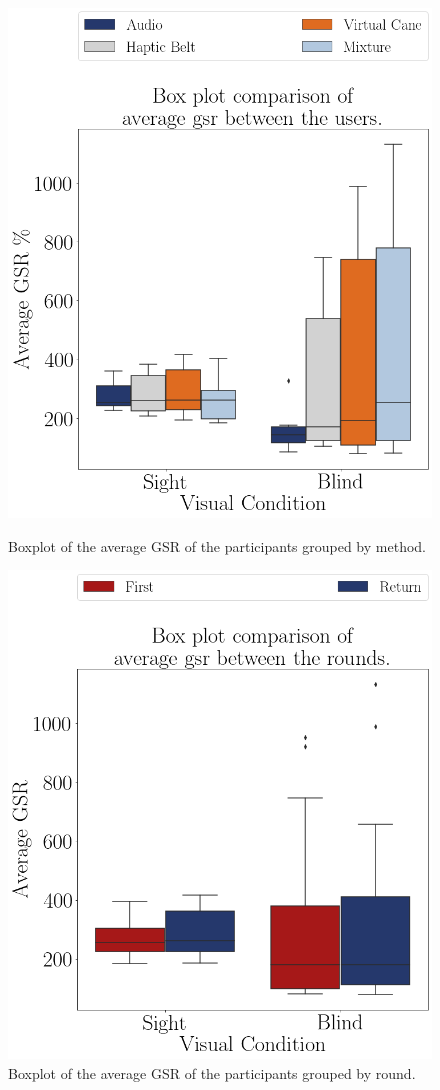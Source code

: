 \begin{figure}[!htb]
    \centering
    \begin{minipage}{0.45\textwidth}
        \centering
        \includegraphics[width = 0.8\linewidth]{Resultados/GSR/Figuras/png/boxplot_gsr_avg_4_scene.png}
        \caption{Boxplot of the average GSR of the participants grouped by method.}
        \label{fig:boxplot_gsr_avg_4_scene}
    \end{minipage}
    \begin{minipage}{0.45\textwidth}
        \centering
        \includegraphics[width = 0.8\linewidth]{Resultados/GSR/Figuras/png/boxplot_gsr_avg_4_rounds.png}
        \caption{Boxplot of the average GSR of the participants grouped by round.}
        \label{fig:boxplot_gsr_avg_4_rounds}
    \end{minipage}
\end{figure}

